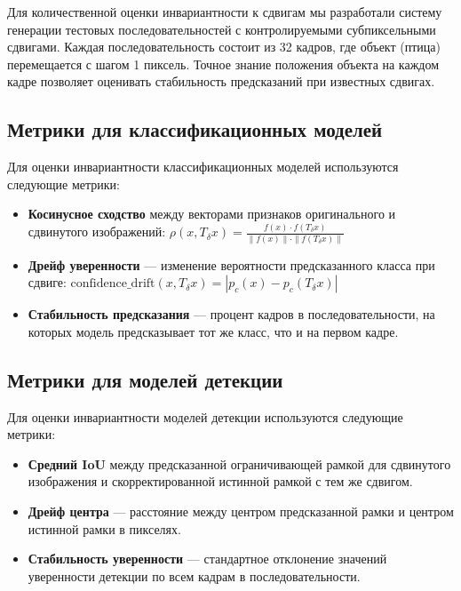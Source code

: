 Для количественной оценки инвариантности к сдвигам мы разработали систему генерации тестовых последовательностей с контролируемыми субпиксельными сдвигами. Каждая последовательность состоит из 32 кадров, где объект (птица) перемещается с шагом 1 пиксель. Точное знание положения объекта на каждом кадре позволяет оценивать стабильность предсказаний при известных сдвигах.

\subsection{Метрики для классификационных моделей}
\label{methods:evaluation:classification}

Для оценки инвариантности классификационных моделей используются следующие метрики:

\begin{itemize}
    \item \textbf{Косинусное сходство} между векторами признаков оригинального и сдвинутого изображений:
    $\rho(x, T_{\delta}x) = \frac{f(x) \cdot f(T_{\delta}x)}{\|f(x)\| \cdot \|f(T_{\delta}x)\|}$
    
    \item \textbf{Дрейф уверенности} — изменение вероятности предсказанного класса при сдвиге:
    $\text{confidence\_drift}(x, T_{\delta}x) = |p_c(x) - p_c(T_{\delta}x)|$
    
    \item \textbf{Стабильность предсказания} — процент кадров в последовательности, на которых модель предсказывает тот же класс, что и на первом кадре.
\end{itemize}

\subsection{Метрики для моделей детекции}
\label{methods:evaluation:detection}

Для оценки инвариантности моделей детекции используются следующие метрики:

\begin{itemize}
    \item \textbf{Средний IoU} между предсказанной ограничивающей рамкой для сдвинутого изображения и скорректированной истинной рамкой с тем же сдвигом.
    
    \item \textbf{Дрейф центра} — расстояние между центром предсказанной рамки и центром истинной рамки в пикселях.
    
    \item \textbf{Стабильность уверенности} — стандартное отклонение значений уверенности детекции по всем кадрам в последовательности.
\end{itemize}

 